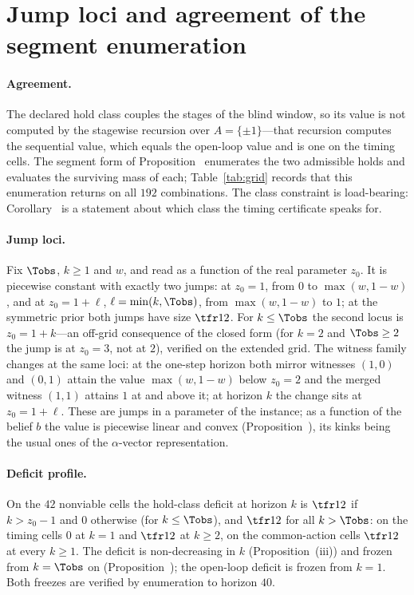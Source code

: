\section{Jump loci and agreement of the segment enumeration}\label{si:loci}

\paragraph{Agreement.} The declared hold class couples the stages of the blind window, so its value is not computed by the stagewise recursion over $A=\{\pm1\}$---that recursion computes the sequential value, which equals the open-loop value  and is one on the timing cells. The segment form of Proposition~ enumerates the two admissible holds and evaluates the surviving mass of each; Table~\ref{tab:grid} records that this enumeration returns  on all $192$ combinations. The class constraint is load-bearing: Corollary~ is a statement about which class the timing certificate speaks for.

\paragraph{Jump loci.} Fix $\Tobs$, $k\ge1$ and $w$, and read  as a function of the real parameter $z_0$. It is piecewise constant with exactly two jumps: at $z_0=1$, from $0$ to $\max(w,1-w)$, and at $z_0=1+\ell$, $\ell=\min(k,\Tobs)$, from $\max(w,1-w)$ to $1$; at the symmetric prior both jumps have size $\tfr12$. For $k\le\Tobs$ the second locus is $z_0=1+k$---an off-grid consequence of the closed form (for $k=2$ and $\Tobs\ge2$ the jump is at $z_0=3$, not at $2$), verified on the extended grid. The witness family changes at the same loci: at the one-step horizon both mirror witnesses $(1,0)$ and $(0,1)$ attain the value $\max(w,1-w)$ below $z_0=2$ and the merged witness $(1,1)$ attains $1$ at and above it; at horizon $k$ the change sits at $z_0=1+\ell$. These are jumps in a parameter of the instance; as a function of the belief $b$ the value is piecewise linear and convex (Proposition~), its kinks being the usual ones of the $\alpha$-vector representation.

\paragraph{Deficit profile.} On the $42$ nonviable cells the hold-class deficit at horizon $k$ is $\tfr12$ if $k>z_0-1$ and $0$ otherwise (for $k\le\Tobs$), and $\tfr12$ for all $k>\Tobs$: on the timing cells $0$ at $k=1$ and $\tfr12$ at $k\ge2$, on the common-action cells $\tfr12$ at every $k\ge1$. The deficit is non-decreasing in $k$ (Proposition~(iii)) and frozen from $k=\Tobs$ on (Proposition~); the open-loop deficit is frozen from $k=1$. Both freezes are verified by enumeration to horizon $40$.
